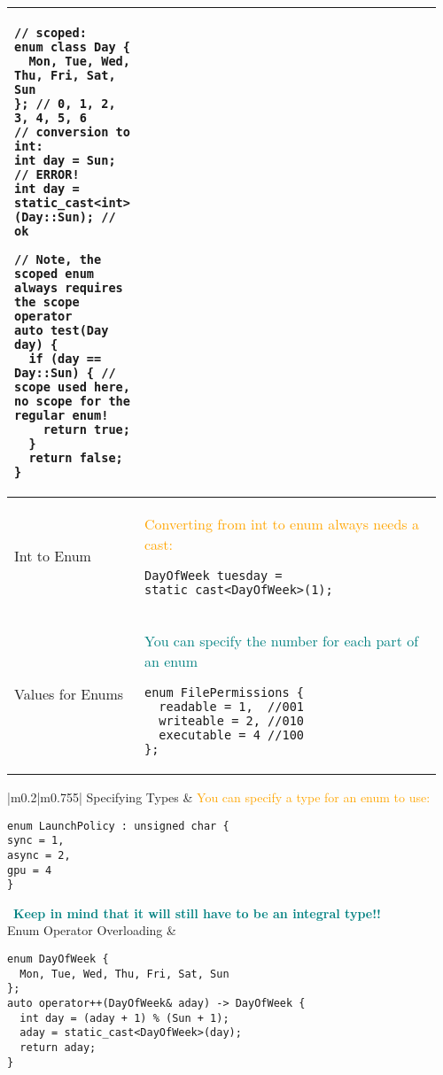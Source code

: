 \documentclass[main.tex,fontsize=8pt,paper=a4,paper=portrait,DIV=calc,]{scrartcl}
\begin{document}
\begin{table}[ht!]
\begin{tabular}{|m{0.2\linewidth}|m{0.755\linewidth}|}
\begin{lstlisting}
// scoped:
enum class Day { 
  Mon, Tue, Wed, Thu, Fri, Sat, Sun
}; // 0, 1, 2, 3, 4, 5, 6
// conversion to int:
int day = Sun; // ERROR!
int day = static_cast<int>(Day::Sun); // ok

// Note, the scoped enum always requires the scope operator
auto test(Day day) {
  if (day == Day::Sun) { // scope used here, no scope for the regular enum!
    return true;
  }
  return false;
}
\end{lstlisting}\\
\hline
Int to Enum & 
\textcolor{orange}{Converting from int to enum always needs a cast:}\newline
\begin{lstlisting}
DayOfWeek tuesday = static_cast<DayOfWeek>(1);
\end{lstlisting}\\
\hline
Values for Enums &
\textcolor{teal}{You can specify the number for each part of an enum}\newline
\begin{lstlisting}
enum FilePermissions {
  readable = 1,  //001
  writeable = 2, //010
  executable = 4 //100
};
\end{lstlisting}\\
\hline

\hline

\hline

\hline

\hline
\end{tabular}
\end{table}
\pagebreak
\begin{table}[ht!]
\begin{tabular}{|m{0.2\linewidth}|m{0.755\linewidth}|}
\hline
Specifying Types & 
\textcolor{orange}{You can specify a type for an enum to use:}\newline
\begin{lstlisting}
enum LaunchPolicy : unsigned char {
sync = 1,
async = 2,
gpu = 4
}
\end{lstlisting} 
\, \newline
\textcolor{teal}{\textbf{Keep in mind that it will still have to be an integral type!!}}\\
\hline
Enum Operator Overloading & 
\begin{lstlisting}
enum DayOfWeek {
  Mon, Tue, Wed, Thu, Fri, Sat, Sun
};
auto operator++(DayOfWeek& aday) -> DayOfWeek {
  int day = (aday + 1) % (Sun + 1);
  aday = static_cast<DayOfWeek>(day);
  return aday;
}
\end{lstlisting}\\
\hline

\hline

\hline

\hline

\hline

\hline

\hline

\hline

\hline

\hline

\hline

\hline
\end{tabular}
\end{table}
\end{document}
